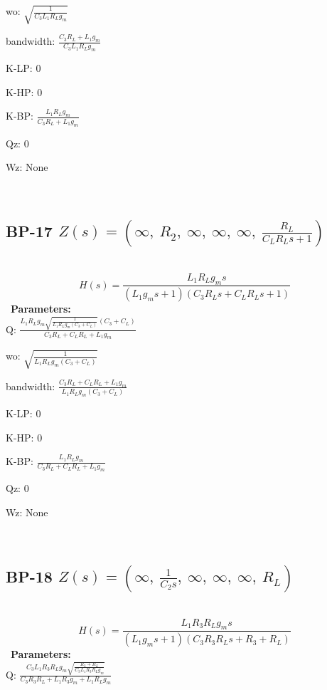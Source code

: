 \documentclass{article}
\begin{document}
wo: $\sqrt{\frac{1}{C_{3} L_{1} R_{L} g_{m}}}$\ 

bandwidth: $\frac{C_{3} R_{L} + L_{1} g_{m}}{C_{3} L_{1} R_{L} g_{m}}$\ 

K-LP: $0$\ 

K-HP: $0$\ 

K-BP: $\frac{L_{1} R_{L} g_{m}}{C_{3} R_{L} + L_{1} g_{m}}$\ 

Qz: $0$\ 

Wz: $\text{None}$\ 

\ 

\subsection{BP-17 $Z(s) = \left( \infty, \  R_{2}, \  \infty, \  \infty, \  \infty, \  \frac{R_{L}}{C_{L} R_{L} s + 1}\right)$ } \ 
\textbf{\[H(s) = \frac{L_{1} R_{L} g_{m} s}{\left(L_{1} g_{m} s + 1\right) \left(C_{3} R_{L} s + C_{L} R_{L} s + 1\right)}\] } \ 
\textbf{Parameters:}\\ 

Q: $\frac{L_{1} R_{L} g_{m} \sqrt{\frac{1}{L_{1} R_{L} g_{m} \left(C_{3} + C_{L}\right)}} \left(C_{3} + C_{L}\right)}{C_{3} R_{L} + C_{L} R_{L} + L_{1} g_{m}}$\ 

wo: $\sqrt{\frac{1}{L_{1} R_{L} g_{m} \left(C_{3} + C_{L}\right)}}$\ 

bandwidth: $\frac{C_{3} R_{L} + C_{L} R_{L} + L_{1} g_{m}}{L_{1} R_{L} g_{m} \left(C_{3} + C_{L}\right)}$\ 

K-LP: $0$\ 

K-HP: $0$\ 

K-BP: $\frac{L_{1} R_{L} g_{m}}{C_{3} R_{L} + C_{L} R_{L} + L_{1} g_{m}}$\ 

Qz: $0$\ 

Wz: $\text{None}$\ 

\ 

\subsection{BP-18 $Z(s) = \left( \infty, \  \frac{1}{C_{2} s}, \  \infty, \  \infty, \  \infty, \  R_{L}\right)$ } \ 
\textbf{\[H(s) = \frac{L_{1} R_{3} R_{L} g_{m} s}{\left(L_{1} g_{m} s + 1\right) \left(C_{3} R_{3} R_{L} s + R_{3} + R_{L}\right)}\] } \ 
\textbf{Parameters:}\\ 

Q: $\frac{C_{3} L_{1} R_{3} R_{L} g_{m} \sqrt{\frac{R_{3} + R_{L}}{C_{3} L_{1} R_{3} R_{L} g_{m}}}}{C_{3} R_{3} R_{L} + L_{1} R_{3} g_{m} + L_{1} R_{L} g_{m}}$\ 
\end{document}

